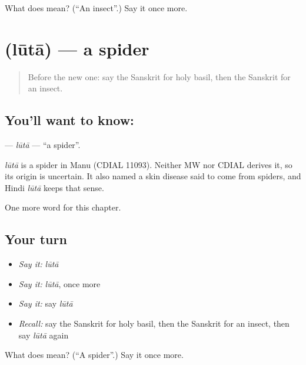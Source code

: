 \begin{tcolorbox}[breakable,colback=teal!4,colframe=teal!35!black,title={Before you move on}]
What does  mean? (\textquotedblleft{}An insect\textquotedblright{}.) Say it once more.
\end{tcolorbox}
\section[\texorpdfstring{\sk{लूता} (lūtā)}{लूता (lūtā)}]{ (lūtā) — a spider}

\label{lesson:SA-C253-luta}



\begin{quote}
Before the new one: say the Sanskrit for holy basil, then the Sanskrit for an insect.
\end{quote}

\subsection*{You'll want to know: }
\textbf{} — \emph{lūtā} — \textquotedblleft{}a spider\textquotedblright{}.

\begin{cousinweb}
\emph{lūtā} is a spider in Manu (CDIAL 11093). Neither MW nor CDIAL derives it, so its origin is uncertain. It also named a skin disease said to come from spiders, and Hindi \emph{lūtā} keeps that sense.
\end{cousinweb}

\begin{grammarlens}[title={What you've built}]
One more word for this chapter.
\end{grammarlens}

\subsection*{Your turn}
\begin{itemize}
\raggedright
  \item \emph{Say it:} \emph{lūtā}
  \item \emph{Say it:} \emph{lūtā}, once more
  \item \emph{Say it:} say \emph{lūtā}
  \item \emph{Recall:} say the Sanskrit for holy basil, then the Sanskrit for an insect, then say \emph{lūtā} again
\end{itemize}

\begin{tcolorbox}[breakable,colback=teal!4,colframe=teal!35!black,title={Before you move on}]
What does  mean? (\textquotedblleft{}A spider\textquotedblright{}.) Say it once more.
\end{tcolorbox}
